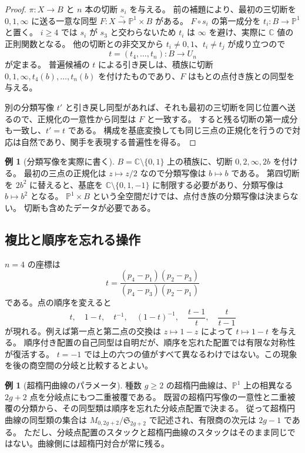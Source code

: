 \documentclass[dvipdfmx,a4paper,11pt]{article}
\theoremstyle{definition}
\newtheorem{exa}[thm]{例}
\newcommand{\C}{\mathbb C}\newcommand{\R}{\mathbb R}\newcommand{\Z}{\mathbb Z}\newcommand{\Q}{\mathbb Q}
\newcommand{\PP}{\mathbb P}\newcommand{\HH}{\mathbb H}
\begin{document}
\begin{proof}
$\pi:X\to B$ と $n$ 本の切断 $s_i$ を与える。
前の補題により、最初の三切断を $0,1,\infty$ に送る一意な同型
$F:X\xrightarrow{\sim}\PP^1\times B$ がある。
$F\circ s_i$ の第一成分を $t_i:B\to\PP^1$ と置く。
$i\ge4$ では $s_i$ が $s_3$ と交わらないため $t_i$ は $\infty$ を避け、実際に $\C$ 値の正則関数となる。
他の切断との非交叉から $t_i\neq0,1$、$t_i\neq t_j$ が成り立つので
\[
t=(t_4,\ldots,t_n):B\longrightarrow U_n
\]
が定まる。
普遍候補の $t$ による引き戻しは、積族に切断 $0,1,\infty,t_4(b),\ldots,t_n(b)$ を付けたものであり、$F$ はもとの点付き族との同型を与える。

別の分類写像 $t'$ と引き戻し同型があれば、それも最初の三切断を同じ位置へ送るので、正規化の一意性から同型は $F$ と一致する。
すると残る切断の第一成分も一致し、$t'=t$ である。
構成を基底変換しても同じ三点の正規化を行うので対応は自然であり、関手を表現する普遍性を得る。
\end{proof}
\begin{exa}[分類写像を実際に書く]
$B=\C\setminus\{0,1\}$ 上の積族に、切断 $0,2,\infty,2b$ を付ける。
最初の三点の正規化は $z\mapsto z/2$ なので分類写像は $b\mapsto b$ である。
第四切断を $2b^2$ に替えると、基底を $\C\setminus\{0,1,-1\}$ に制限する必要があり、分類写像は $b\mapsto b^2$ となる。
$\PP^1\times B$ という全空間だけでは、点付き族の分類写像は決まらない。
切断も含めたデータが必要である。
\end{exa}

\subsection{複比と順序を忘れる操作}
$n=4$ の座標は
\[
t=\frac{(p_4-p_1)(p_2-p_3)}{(p_4-p_3)(p_2-p_1)}
\]
である。点の順序を変えると
\[
t,\quad1-t,\quad t^{-1},\quad(1-t)^{-1},\quad\frac{t-1}{t},\quad\frac t{t-1}
\]
が現れる。例えば第一点と第二点の交換は $z\mapsto1-z$ によって $t\mapsto1-t$ を与える。
順序付き配置の自己同型は自明だが、順序を忘れた配置では有限な対称性が復活する。
$t=-1$ では上の六つの値がすべて異なるわけではない。この現象を後の商空間の分岐と比較するとよい。

\begin{exa}[超楕円曲線のパラメータ]
種数 $g\ge2$ の超楕円曲線は、$\PP^1$ 上の相異なる $2g+2$ 点を分岐点にもつ二重被覆である。
既習の超楕円写像の一意性と二重被覆の分類から、その同型類は順序を忘れた分岐点配置で決まる。
従って超楕円曲線の同型類の集合は $M_{0,2g+2}/\mathfrak S_{2g+2}$ で記述され、有限商の次元は $2g-1$ である。
ただし、分岐点配置のスタックと超楕円曲線のスタックはそのまま同じではない。曲線側には超楕円対合が常に残る。
\end{exa}
\end{document}
